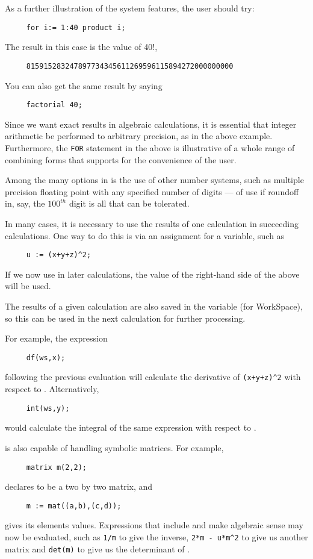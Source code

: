 As a further illustration of the system features, the user should try:
\begin{verbatim}
     for i:= 1:40 product i;
\end{verbatim}
The result in this case is the value of 40!,
\begin{verbatim}
     815915283247897734345611269596115894272000000000
\end{verbatim}
You can also get the same result by saying
\begin{verbatim}
     factorial 40;
\end{verbatim}
Since we want exact results in algebraic calculations, it is essential that
integer arithmetic be performed to arbitrary precision, as in the above
example. Furthermore, the {\tt FOR} statement in the above is illustrative of a
whole range of combining forms that {\REDUCE} supports for the convenience of
the user.

Among the many options in {\REDUCE} is the use of other number systems, such
as multiple precision floating point with any specified number of digits ---
of use if roundoff in, say, the $100^{th}$ digit is all that can be tolerated.

In many cases, it is necessary to use the results of one calculation in
succeeding calculations. One way to do this is via an assignment for a
variable, such as
\begin{verbatim}
     u := (x+y+z)^2;
\end{verbatim}
If we now use  in later calculations, the value of the right-hand
side of the above will be used.

The results of a given calculation are also saved in the variable
 (for WorkSpace), so this can be used in the next
calculation for further processing.

For example, the expression
\begin{verbatim}
     df(ws,x);
\end{verbatim}
following the previous evaluation will calculate the derivative of
\texttt{(x+y+z)\textasciicircum2} with respect to . Alternatively,
\begin{verbatim}
     int(ws,y);
\end{verbatim}
would calculate the integral of the same expression with respect to .

{\REDUCE} is also capable of handling symbolic matrices. For example,
\begin{verbatim}
     matrix m(2,2);
\end{verbatim}
declares  to be a two by two matrix, and
\begin{verbatim}
     m := mat((a,b),(c,d));
\end{verbatim}
gives its elements values.  Expressions that include  and make
algebraic sense may now be evaluated, such as \texttt{1/m} to give the
inverse, \texttt{2*m - u*m\textasciicircum2} to give us another matrix
and \texttt{det(m)} to give us the determinant of .

